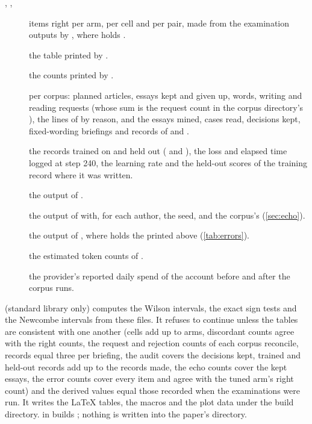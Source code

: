 \begin{description}
\item[, , ] items right per arm,
  per cell and per pair, made from the examination outputs by
  , where  holds
  .
\item[] the table printed by .
\item[] the counts printed by .
\item[] per corpus: planned articles, essays kept and given up, words,
  writing and reading requests (whose sum is the request count in the corpus directory's
  ), the lines of  by reason, and the essays mined,
  cases read, decisions kept, fixed-wording briefings and records of  and
  .
\item[] the records trained on and held out (
  and ), the loss and elapsed time logged at step 240, the
  learning rate and the held-out scores of the training record where it was written.
\item[] the output of .
\item[] the output of  with, for each author, the
  seed,  and the corpus's  (\cref{sec:echo}).
\item[] the output of , where  holds the 
  printed above (\cref{tab:errors}).
\item[] the estimated token counts of .
\item[] the provider's reported daily spend of the account before and
  after the corpus runs.
\end{description}
 (standard library only) computes the Wilson intervals, the exact
sign tests and the Newcombe intervals from these files. It refuses to continue unless the
tables are consistent with one another (cells add up to arms, discordant counts agree with
the right counts, the request and rejection counts of each corpus reconcile, records equal
three per briefing, the audit covers the decisions kept, trained and held-out records add up
to the records made, the echo counts cover the kept essays, the error counts cover every item
and agree with the tuned arm's right count) and the derived values equal those recorded when the examinations were
run. It writes the LaTeX tables, the macros and the plot data under the build directory.
 in  builds ;
nothing is written into the paper's directory.
